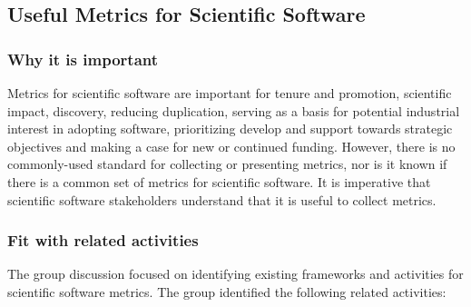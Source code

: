 \subsection{Useful Metrics for Scientific Software}
\label{sec:software-metrics}

\subsubsection{Why it is important}

Metrics for scientific software are important for tenure and promotion, scientific impact, discovery, reducing duplication, serving as a basis for potential industrial interest in adopting software, prioritizing develop and support towards 
strategic objectives and making a case for new or continued funding.  However, there is no commonly-used 
standard for collecting or presenting metrics, nor is it known if there is a common set of metrics for scientific software. 
 It is imperative that scientific software stakeholders understand that it is useful to collect metrics.

\subsubsection{Fit with related activities}

The group discussion  focused on identifying existing frameworks and activities for scientific software metrics.  
The group identified the following related activities:


